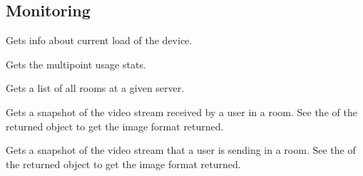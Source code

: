\subsection{Monitoring}
\begin{Api}

Gets info about current load of the device.

Gets the multipoint usage stats.

Gets a list of all rooms at a given server.

Gets a snapshot of the video stream received by a user in a room. See the  of the returned object to get the image format returned.

Gets a snapshot of the video stream that a user is sending in a room. See the  of the returned object to get the image format returned.

\end{Api}


